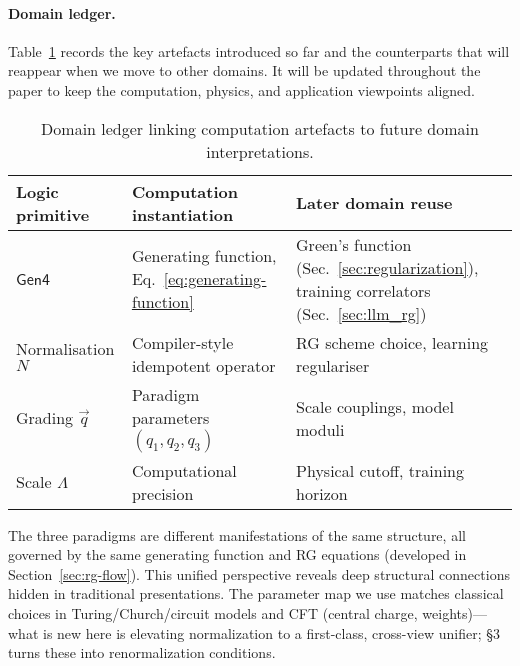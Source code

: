 \paragraph{Domain ledger.} Table~\ref{tab:domain-ledger} records the key artefacts introduced so far and the counterparts that will reappear when we move to other domains. It will be updated throughout the paper to keep the computation, physics, and application viewpoints aligned.

\begin{table}[h]
  \centering
  \begin{tabular}{@{}lll@{}}
    \toprule
    Logic primitive & Computation instantiation & Later domain reuse \\
    \midrule
    $\mathsf{Gen4}$ & Generating function, Eq.~\eqref{eq:generating-function} & Green's function (Sec.~\ref{sec:regularization}), training correlators (Sec.~\ref{sec:llm_rg}) \\
    Normalisation $N$ & Compiler-style idempotent operator & RG scheme choice, learning regulariser \\
    Grading $\vec{q}$ & Paradigm parameters $(q_1,q_2,q_3)$ & Scale couplings, model moduli \\
    Scale $\Lambda$ & Computational precision & Physical cutoff, training horizon \\
    \bottomrule
  \end{tabular}
  \caption{Domain ledger linking computation artefacts to future domain interpretations.}
  \label{tab:domain-ledger}
\end{table}

The three paradigms are different manifestations of the same structure, all governed by the same generating function and RG equations (developed in Section~\ref{sec:rg-flow}). This unified perspective reveals deep structural connections hidden in traditional presentations. The parameter map we use matches classical choices in Turing/Church/circuit models and CFT (central charge, weights)—what is new here is elevating normalization to a first-class, cross-view unifier; §3 turns these into renormalization conditions.
